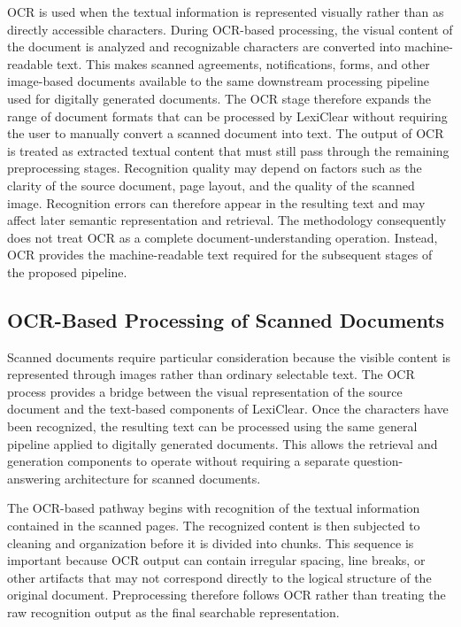 \documentclass[12pt,a4paper,oneside]{report}
\begin{document}
OCR is used when the textual information is represented visually rather than
as directly accessible characters. During OCR-based processing, the visual
content of the document is analyzed and recognizable characters are
converted into machine-readable text. This makes scanned agreements,
notifications, forms, and other image-based documents available to the
same downstream processing pipeline used for digitally generated documents.
The OCR stage therefore expands the range of document formats that can be
processed by LexiClear without requiring the user to manually convert a
scanned document into text. The output of OCR is treated as extracted textual content that must still
pass through the remaining preprocessing stages. Recognition quality may
depend on factors such as the clarity of the source document, page layout,
and the quality of the scanned image. Recognition errors can therefore
appear in the resulting text and may affect later semantic representation
and retrieval. The methodology consequently does not treat OCR as a
complete document-understanding operation. Instead, OCR provides the
machine-readable text required for the subsequent stages of the proposed
pipeline.

\subsection{OCR-Based Processing of Scanned Documents}

Scanned documents require particular consideration because the visible
content is represented through images rather than ordinary selectable text.
The OCR process provides a bridge between the visual representation of the
source document and the text-based components of LexiClear. Once the
characters have been recognized, the resulting text can be processed using
the same general pipeline applied to digitally generated documents. This
allows the retrieval and generation components to operate without requiring
a separate question-answering architecture for scanned documents.

The OCR-based pathway begins with recognition of the textual information
contained in the scanned pages. The recognized content is then subjected to
cleaning and organization before it is divided into chunks. This sequence is
important because OCR output can contain irregular spacing, line breaks, or
other artifacts that may not correspond directly to the logical structure of
the original document. Preprocessing therefore follows OCR rather than
treating the raw recognition output as the final searchable representation.
\end{document}
